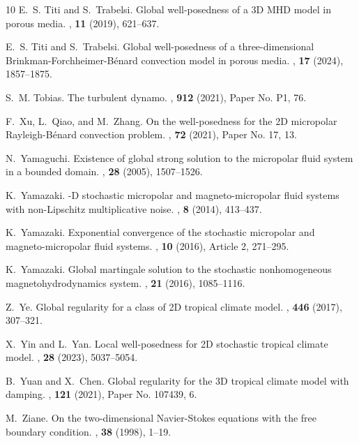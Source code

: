 \documentclass[11pt, reqno]{amsart}
\theoremstyle{definition}
\numberwithin{equation}{section}
\begin{document}
\begin{thebibliography}{10}
	E.~S. Titi and S.~Trabelsi.
	\newblock Global well-posedness of a 3{D} {MHD} model in porous media.
	,  {\bf 11} (2019), 621--637.
	
	E.~S. Titi and S.~Trabelsi.
	\newblock Global well-posedness of a three-dimensional
	{B}rinkman-{F}orchheimer-{B}\'enard convection model in porous media.
	,  {\bf 17} (2024),
	1857--1875.
	
	S.~M. Tobias.
	\newblock The turbulent dynamo.
	,  {\bf 912} (2021), Paper No. P1, 76.
	
	F.~Xu, L.~Qiao, and M.~Zhang.
	\newblock On the well-posedness for the 2{D} micropolar {R}ayleigh-{B}\'enard
	convection problem.
	,  {\bf 72} (2021), Paper No. 17, 13.
	
	N.~Yamaguchi.
	\newblock Existence of global strong solution to the micropolar fluid system in
	a bounded domain.
	,  {\bf 28} (2005), 1507--1526.
	
	K.~Yamazaki.
	-{D} stochastic micropolar and magneto-micropolar fluid systems with
	non-{L}ipschitz multiplicative noise.
	,  {\bf 8} (2014), 413--437.
	
	K.~Yamazaki.
	\newblock Exponential convergence of the stochastic micropolar and
	magneto-micropolar fluid systems.
	,  {\bf 10} (2016), Article 2, 271--295.
	
	K.~Yamazaki.
	\newblock Global martingale solution to the stochastic nonhomogeneous
	magnetohydrodynamics system.
	,  {\bf 21} (2016), 1085--1116.
	
	Z.~Ye.
	\newblock Global regularity for a class of 2{D} tropical climate model.
	,  {\bf 446} (2017), 307--321.
	
	X.~Yin and L.~Yan.
	\newblock Local well-posedness for 2{D} stochastic tropical climate model.
	,  {\bf 28} (2023),
	5037--5054.
	
	B.~Yuan and X.~Chen.
	\newblock Global regularity for the 3{D} tropical climate model with damping.
	,  {\bf 121} (2021), Paper No. 107439, 6.
	
	M.~Ziane.
	\newblock On the two-dimensional {N}avier-{S}tokes equations with the free
	boundary condition.
	,  {\bf 38} (1998), 1--19.
	
\end{thebibliography}
\end{document}
